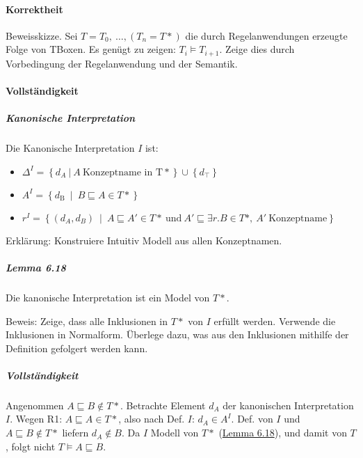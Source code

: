 \paragraph{Korrektheit}\label{korrektheit-1}

Beweisskizze. Sei $T = T_{0},\ \ldots,(T_{n} = T*)$ die durch
Regelanwendungen erzeugte Folge von TBoxen. Es genügt zu zeigen:
$T_{i} \models T_{i + 1}$. Zeige dies durch Vorbedingung der
Regelanwendung und der Semantik.

\paragraph{Vollständigkeit}\label{vollstuxe4ndigkeit-1}

\subparagraph{Kanonische
Interpretation}\label{kanonische-interpretation}

Die Kanonische Interpretation $I$ ist:

\begin{itemize}
\item
  $\Delta^{I} = \left\{ d_{A}\ |\ A\ \mathrm{\text{Konzeptname\ in\ T}}* \right\} \cup \left\{ d_{\top} \right\}$
\item
  $A^{I} = \left\{ d_{\text{B\ }} \middle| \ B \sqsubseteq A \in T* \right\}$
\item
  $r^{I} = \left\{ \left( d_{A},d_{B} \right)\  \middle| \ A \sqsubseteq A' \in T*\ \mathrm{\text{und}}\ A' \sqsubseteq \exists r.B \in T*,\ A'\ \mathrm{\text{Konzeptname}} \right\}$
\end{itemize}

Erklärung: Konstruiere Intuitiv Modell aus allen Konzeptnamen.

\hypertarget{lemma-6.18}{\subparagraph{Lemma 6.18}\label{lemma-6.18}}

Die kanonische Interpretation ist ein Model von $T*$.

Beweis: Zeige, dass alle Inklusionen in $T*$ von $I$ erfüllt werden.
Verwende die Inklusionen in Normalform. Überlege dazu, was aus den
Inklusionen mithilfe der Definition gefolgert werden kann.

\subparagraph{Vollständigkeit}\label{vollstuxe4ndigkeit-2}

Angenommen $A \sqsubseteq B \notin T*$. Betrachte Element $d_{A}$
der kanonischen Interpretation $I$. Wegen R1:
$A \sqsubseteq A \in T*$, also nach Def. $I$: $d_{A} \in A^{I}$.
Def. von $I$ und $A \sqsubseteq B \notin T*$ liefern
$d_{A} \notin B$. Da $I$ Modell von $T*$
(\protect\hyperlink{lemma-6.18}{Lemma 6.18}), und damit von $T$, folgt
nicht $T \models A \sqsubseteq B$.

